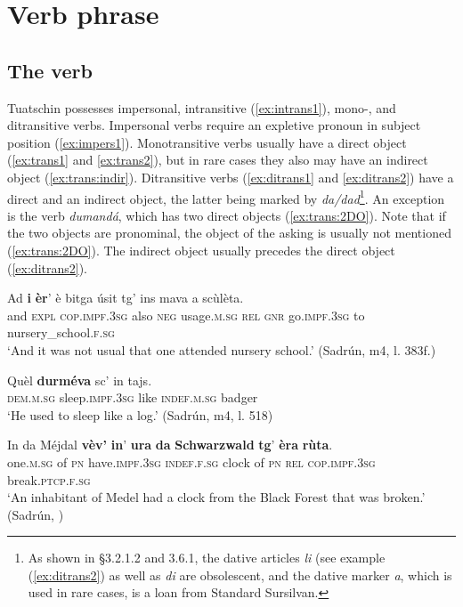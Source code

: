 \chapter{Verb phrase}


\section{The verb}
Tuatschin possesses impersonal, intransitive (\ref{ex:intrans1}), mono-, and ditransitive verbs. Impersonal verbs require an expletive pronoun in subject position (\ref{ex:impers1}). Monotransitive verbs usually have a direct object (\ref{ex:trans1} and \ref{ex:trans2}), but in rare cases they also may have an indirect object (\ref{ex:trans:indir}). Ditransitive verbs (\ref{ex:ditrans1} and \ref{ex:ditrans2}) have a direct and an indirect object, the latter being marked by \textit{da/dad}\footnote{As shown in §3.2.1.2 and 3.6.1, the dative articles \textit{li} (see example (\ref{ex:ditrans2}) as well as \textit{di} are obsolescent, and the dative marker \textit{a}, which is used in rare cases, is a loan from Standard Sursilvan.}. An exception is the verb \textit{dumandá}, which has two direct objects (\ref{ex:trans:2DO}). Note that if the two objects are pronominal, the object of the asking is usually not mentioned (\ref{ex:trans:2DO}). The indirect object usually precedes the direct object (\ref{ex:ditrans2}).

\ea
\label{ex:impers1}
\gll Ad \textbf{i} \textbf{èr}’ è bitga úsit tg’ ins mava a scùlèta.\\
and  \textsc{expl} \textsc{cop.impf.3sg} also \textsc{neg} usage.\textsc{m.sg}  \textsc{rel} \textsc{gnr} go.\textsc{impf.3sg} to nursery\_school.\textsc{f.sg}\\
\glt `And it was not usual that one attended nursery school.' (Sadrún, m4, l. 383f.)
\z

\ea
\label{ex:intrans1}
\gll  Quèl \textbf{durméva} sc’ in tajs.  \\
\textsc{dem.m.sg} sleep.\textsc{impf.3sg} like \textsc{indef.m.sg} badger\\
\glt `He used to sleep like a log.' (Sadrún, m4, l. 518)
\z

\ea\label{ex:trans1}
\gll    In da Méjdal \textbf{vèv'} {\ob}\textbf{in}' \textbf{ura} \textbf{da} \textbf{Schwarzwald} \textbf{tg}' \textbf{èra} \textbf{rùta}{\cb}.\\
     one.\textsc{m.sg} of \textsc{pn} have.\textsc{impf.3sg} \textsc{indef.f.sg} clock of \textsc{pn} \textsc{rel} \textsc{cop.impf.3sg} break.\textsc{ptcp.f.sg}\\
\glt `An inhabitant of Medel had a clock from the Black Forest that was broken.' (Sadrún, \citealt[106]{Büchli1966})
\z

